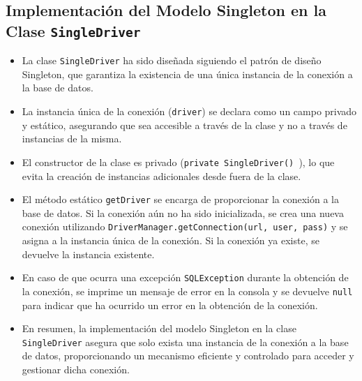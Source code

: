 \documentclass{article}
\begin{document}
\subsection{Implementación del Modelo Singleton en la Clase \texttt{SingleDriver}}
\begin{itemize}
  \item La clase \texttt{SingleDriver} ha sido diseñada siguiendo el patrón de diseño Singleton, que garantiza la existencia de una única instancia de la conexión a la base de datos.

  \item La instancia única de la conexión (\texttt{driver}) se declara como un campo privado y estático, asegurando que sea accesible a través de la clase y no a través de instancias de la misma.

  \item El constructor de la clase es privado (\texttt{private SingleDriver() {}}), lo que evita la creación de instancias adicionales desde fuera de la clase.

  \item El método estático \texttt{getDriver} se encarga de proporcionar la conexión a la base de datos. Si la conexión aún no ha sido inicializada, se crea una nueva conexión utilizando \texttt{DriverManager.getConnection(url, user, pass)} y se asigna a la instancia única de la conexión. Si la conexión ya existe, se devuelve la instancia existente.

  \item En caso de que ocurra una excepción \texttt{SQLException} durante la obtención de la conexión, se imprime un mensaje de error en la consola y se devuelve \texttt{null} para indicar que ha ocurrido un error en la obtención de la conexión.

  \item En resumen, la implementación del modelo Singleton en la clase \texttt{SingleDriver} asegura que solo exista una instancia de la conexión a la base de datos, proporcionando un mecanismo eficiente y controlado para acceder y gestionar dicha conexión.
\end{itemize}
\end{document}
